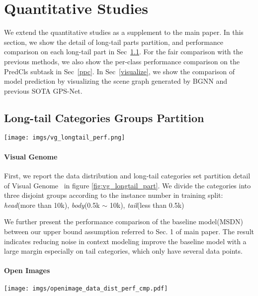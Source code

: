 
\section{Quantitative Studies}
We extend the quantitative studies as a supplement to the main paper.
In this section, we show the detail of long-tail parts partition, and performance comparison on each long-tail part in Sec~\ref{lcgp}.
For the fair comparison with the previous methods, we also show the per-class performance comparison on the PredCls subtask in Sec~\ref{ppc}.
In Sec~\ref{visualize}, we show the comparison of model prediction by visualizing the scene graph generated by BGNN and previous SOTA GPS-Net. 


\subsection{Long-tail Categories Groups Partition} \label{lcgp}

\begin{figure*}[hb]
	\centering
	\texttt{[image: imgs/vg\_longtail\_perf.png]}
	\caption{
		 \textbf{The long-tail categories groups partition and the upper-bound comparison on Visual Genome dataset.} 
	}\label{fig:vg_longtail_part}
\end{figure*}

\paragraph{Visual Genome}
First, we report the data distribution and long-tail categories set partition detail of Visual Genome~\cite{krishna2017visual, xu_scene_2017} in figure \ref{fig:vg_longtail_part}. 
We divide the categories into three disjoint groups according to the instance number in training split: \textit{head}(more than 10k), \textit{body}(0.5k $\sim $ 10k), \textit{tail}(less than 0.5k)

We further present the performance comparison of the baseline model(MSDN) between our upper bound assumption referred to Sec. 1 of main paper. 
The result indicates reducing noise in context modeling improve the baseline model with a large margin especially on tail categories, which only have several data points.


\paragraph{Open Images}

\begin{figure*}
	\centering
	\texttt{[image: imgs/openimage\_data\_dist\_perf\_cmp.pdf]}
	\caption{
		\textbf{The long-tail categories groups partition and per-class performance comparison of Open Images dataset}. Part (A) is the Open Images V4, part (A) is the Open Images V6 dataset. We compare with the two SOTA methods: Causal~\cite{tang_unbiased_2020}, and GPS-Net~\cite{lin_gps-net_2020}.
	}
	\label{fig:oi_dataset_alt}
\end{figure*}



